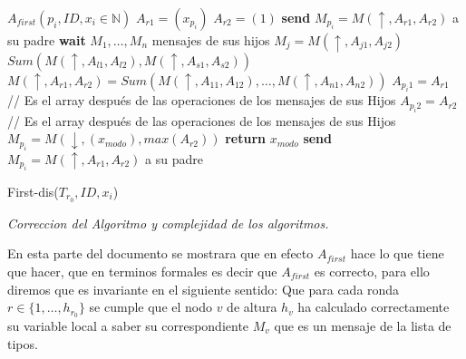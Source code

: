 \documentclass[11pt]{article}
\begin{document}
\begin{algorithm}
\begin{algorithmic}
    \STATE $A_{first}( p_{i}, ID, x_{i} \in \mathbb{N})$
      \STATE $A_{r1} = (x_{p_{i}})$
      \STATE $A_{r2} = (1)$
      \STATE \textbf{send} $M_{p_{i}} = M(\uparrow, A_{r1}, A_{r2})$ a su padre
    \ELSE
      \STATE \textbf{wait} $M_{1},\dots,M_{n}$ mensajes de sus hijos
      \STATE  $M_{j} = M(\uparrow, A_{j1}, A_{j2})$
        \STATE $Sum(M(\uparrow, A_{l1}, A_{l2}), M(\uparrow, A_{s1}, A_{s2}))$
      \ENDFOR
      \STATE $M(\uparrow, A_{r1}, A_{r2}) = Sum(M(\uparrow, A_{11}, A_{12}), \dots, M(\uparrow, A_{n1}, A_{n2})) $
      \STATE $A_{p_{i}1} = A_{r1}$ // Es el array después de las operaciones de los mensajes de sus Hijos
      \STATE $A_{p_{i}2} = A_{r2}$ // Es el array después de las operaciones de los mensajes de sus Hijos
        \STATE $M_{p_{i}} = M(\downarrow, (x_{modo}), max(A_{r2}))$
        \STATE \textbf{return} $x_{modo}$
      \ELSE
        \STATE \textbf{send} $M_{p_{i}} = M(\uparrow, A_{r1}, A_{r2})$ a su padre
      \ENDIF
    \ENDIF
\end {algorithmic}
\caption{First-dis($T_{r_0},ID,x_{i}$)\label{lss}}
\end{algorithm}

    \newpage
    \begin{center}
        \begin{Large}
            \textit{Correccion del Algoritmo y complejidad de los algoritmos.}
        \end{Large}
    \end{center}

En esta parte del documento se mostrara que en efecto $A_{first}$ hace lo que tiene que hacer, que en terminos
formales es decir que $A_{first}$ es correcto, para ello diremos que es invariante en el siguiente sentido:
Que para cada ronda $ r \in \lbrace 1,\dots, h_{r_{0}} \rbrace $ se cumple que el nodo $v$ de altura $h_{v}$ ha calculado correctamente
su variable local a saber su correspondiente $M_{v}$ que es un mensaje de la lista de tipos.
\\
\end{document}
